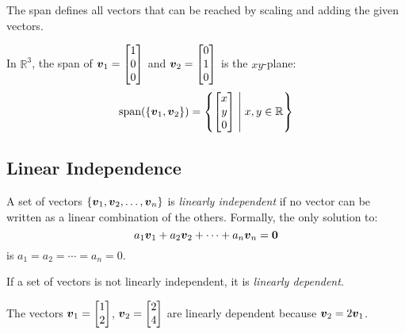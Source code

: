The span defines all vectors that can be reached by scaling and adding the given vectors.

\begin{example}
In $\mathbb{R}^3$, the span of $\boldsymbol{v}_1 = \begin{bmatrix} 1 \\ 0 \\ 0 \end{bmatrix}$ and $\boldsymbol{v}_2 = \begin{bmatrix} 0 \\ 1 \\ 0 \end{bmatrix}$ is the $xy$-plane:
\begin{equation}
    \text{span}(\{\boldsymbol{v}_1, \boldsymbol{v}_2\}) = \left\{ \begin{bmatrix} x \\ y \\ 0 \end{bmatrix} \;\middle|\; x, y \in \mathbb{R} \right\}
\end{equation}
\end{example}

\subsection{Linear Independence}

\begin{definition}
A set of vectors $\{\boldsymbol{v}_1, \boldsymbol{v}_2, \ldots, \boldsymbol{v}_n\}$ is \emph{linearly independent} if no vector can be written as a linear combination of the others. Formally, the only solution to:
\begin{equation}
    a_1\boldsymbol{v}_1 + a_2\boldsymbol{v}_2 + \cdots + a_n\boldsymbol{v}_n = \boldsymbol{0}
\end{equation}
is $a_1 = a_2 = \cdots = a_n = 0$.
\end{definition}

If a set of vectors is not linearly independent, it is \emph{linearly dependent}.

\begin{example}
The vectors $\boldsymbol{v}_1 = \begin{bmatrix} 1 \\ 2 \end{bmatrix}$, $\boldsymbol{v}_2 = \begin{bmatrix} 2 \\ 4 \end{bmatrix}$ are linearly dependent because $\boldsymbol{v}_2 = 2\boldsymbol{v}_1$.
\end{example}

